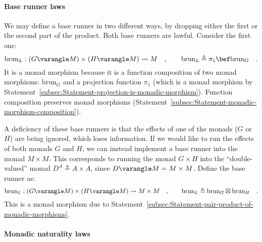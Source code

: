 \paragraph{Base runner laws}

We may define a base runner in two different ways, by dropping either
the first or the second part of the product. Both base runners are
lawful. Consider the first one:
\[
\text{brun}_{L}:(G\varangle M)\times(H\varangle M)\leadsto M\quad,\quad\quad\text{brun}_{L}\triangleq\pi_{1}\bef\text{brun}_{G}\quad.
\]
It is a monad morphism because it is a function composition of two
monad morphisms: $\text{brun}_{G}$ and a projection function $\pi_{1}$
(which is a monad morphism by Statement~\ref{subsec:Statement-projection-is-monadic-morphism}).
Function composition preserves monad morphisms (Statement~\ref{subsec:Statement-monadic-morphism-composition}).

A deficiency of these base runners is that the effects of one of the
monads ($G$ or $H$) are being ignored, which loses information.
If we would like to run the effects of both monads $G$ and $H$,
we can instead implement a base runner into the monad $M\times M$.
This corresponds to running the monad $G\times H$ into the \textsf{``}double-valued\textsf{''}
monad $D^{A}\triangleq A\times A$, since $D\varangle M=M\times M$.
Define the base runner as:
\[
\text{brun}_{L}:(G\varangle M)\times(H\varangle M)\leadsto M\times M\quad,\quad\quad\text{brun}_{L}\triangleq\text{brun}_{G}\boxtimes\text{brun}_{H}\quad.
\]
This is a monad morphism due to Statement~\ref{subsec:Statement-pair-product-of-monadic-morphisms}.


\paragraph{Monadic naturality laws}

